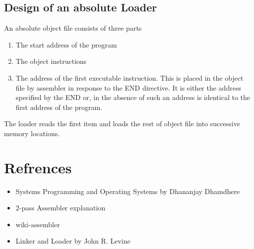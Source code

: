 \documentclass[a4paper,12pt]{extarticle}
\begin{document}
	\subsection{Design of an absolute Loader}
	An absolute object file consists of three parts
	\begin{enumerate}
	\item The start address of the program
	\item The object instructions
	\item The address of the first executable instruction. This is placed in the object
	file by assembler in response to the END directive. It is either the address
	specified by the END or, in the absence of such an address is identical to the
	first address of the program.
	\end{enumerate}
	The loader reads the first item and loads the rest of object file into successive memory
	locations.
	\pagebreak

	\section{Refrences}
	\begin{itemize}
\item Systems Programming and Operating Systems by Dhananjay Dhamdhere 
\item 2-pass Assembler explanation
 \item wiki-assembler
 \item Linker and Loader by John R. Levine
	\end{itemize}
	\pagebreak
	
\end{document}
